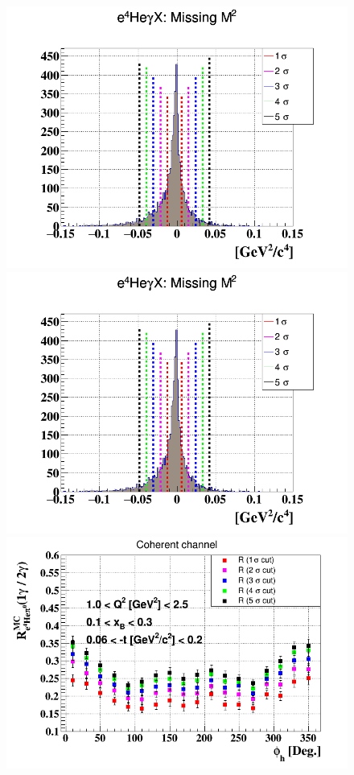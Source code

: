 \begin{figure}[h!]
\includegraphics[scale=0.31]{fig_dvcs/e4Hegamma_M2_Mis_sig.png}
\includegraphics[scale=0.31]{fig_dvcs/e4Hegamma_M2_Mis_sig.png}
\includegraphics[scale=0.31]{fig_dvcs/e4Hegamma_e4Hepi0_Phi_2.png}

\end{figure}
